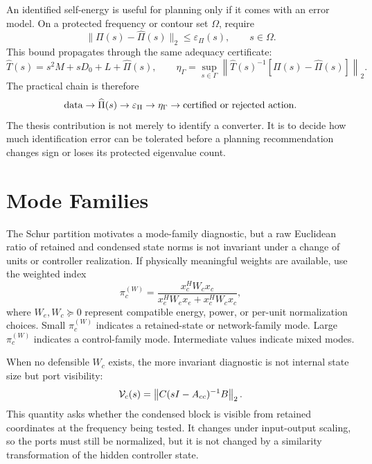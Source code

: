 An identified self-energy is useful for planning only if it comes with an
error model. On a protected frequency or contour set \(\Omega\), require
\begin{equation}
  \|\Pi(s)-\widehat\Pi(s)\|_2\le\varepsilon_\Pi(s),
  \qquad s\in\Omega .
  \label{eq:self_pi_identification_error}
\end{equation}
This bound propagates through the same adequacy certificate:
\begin{equation}
  \widehat T(s)=s^2M+sD_0+L+\widehat\Pi(s),
  \qquad
  \eta_\Gamma
  =
  \sup_{s\in\Gamma}
  \left\|
  \widehat T(s)^{-1}\left[\Pi(s)-\widehat\Pi(s)\right]
  \right\|_2 .
  \label{eq:self_identified_eta}
\end{equation}
The practical chain is therefore
\begin{equation}
  \hbox{data}
  \rightarrow
  \widehat\Pi(s)
  \rightarrow
  \varepsilon_\Pi
  \rightarrow
  \eta_\Gamma
  \rightarrow
  \hbox{certified or rejected action}.
  \label{eq:self_data_to_certification}
\end{equation}
The thesis contribution is not merely to identify a converter. It is to decide
how much identification error can be tolerated before a planning recommendation
changes sign or loses its protected eigenvalue count.

\section{Mode Families}

The Schur partition motivates a mode-family diagnostic, but a raw Euclidean
ratio of retained and condensed state norms is not invariant under a change of
units or controller realization. If physically meaningful weights are available,
use the weighted index
\begin{equation}
  \pi_c^{(W)}
  =
  \frac{x_c^H W_c x_c}
  {x_e^H W_e x_e+x_c^H W_c x_c},
  \label{eq:self_control_participation}
\end{equation}
where \(W_e,W_c\succeq0\) represent compatible energy, power, or per-unit
normalization choices. Small \(\pi_c^{(W)}\) indicates a retained-state or
network-family mode. Large \(\pi_c^{(W)}\) indicates a control-family mode.
Intermediate values indicate mixed modes.

When no defensible \(W_c\) exists, the more invariant diagnostic is not internal
state size but port visibility:
\begin{equation}
  \mathcal V_c(s)
  =
  \left\lVert C(sI-A_{cc})^{-1}B \right\rVert_2 .
  \label{eq:self_controller_visibility}
\end{equation}
This quantity asks whether the condensed block is visible from retained
coordinates at the frequency being tested. It changes under input-output
scaling, so the ports must still be normalized, but it is not changed by a
similarity transformation of the hidden controller state.


